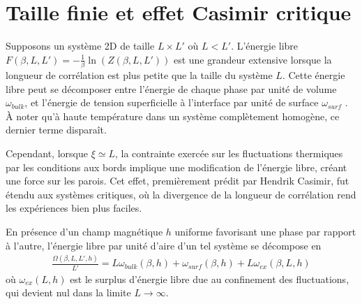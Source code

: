     \section{Taille finie et effet Casimir critique}
    \label{sec-casimir}
    
Supposons un système 2D de taille $L \times L' $ où $L \less L'$. L'énergie libre $F(\beta,L,L') = - \frac{1}{\beta} \ln ( Z(\beta,L,L'))$ est une grandeur extensive lorsque la longueur de corrélation est plus petite que la taille du système $L$. 
Cette énergie libre peut se décomposer entre l'énergie de chaque phase par unité de volume $\omega_{bulk}$, et l'énergie de tension superficielle à l'interface par unité de surface $\omega_{surf}$ \cite{cardozo_finite_2015,lopes_cardozo_critical_2014}. À noter qu'à haute température dans un système complètement homogène, ce dernier terme disparaît.

Cependant, lorsque $\xi \simeq L$, la contrainte exercée sur les fluctuations thermiques par les conditions aux bords implique une modification de l'énergie libre, créant une force sur les parois. Cet effet, premièrement prédit par Hendrik Casimir\cite{h_b_g_casimir_attraction_1948}, fut étendu aux systèmes critiques\cite{nikolic_is_2017}, où la divergence de la longueur de corrélation rend les expériences bien plus faciles\cite{nguyen_controlling_2013}.

En présence d'un champ magnétique $h$ uniforme favorisant une phase par rapport à l'autre, l'énergie libre par unité d'aire d'un tel système se décompose \cite{lopes_cardozo_critical_2014,cardozo_finite_2015} en 
\begin{align}
    \frac{\Omega(\beta,L,L',h)}{L'} = L \omega_{bulk}(\beta,h) + \omega_{surf}(\beta,h) + L \omega_{ex}(\beta,L,h)
    \label{decomposition-energie}
\end{align}
où $\omega_{ex}(L,h)$ est le surplus d'énergie libre due au confinement des fluctuations, qui devient nul dans la limite $L\to \infty$.

